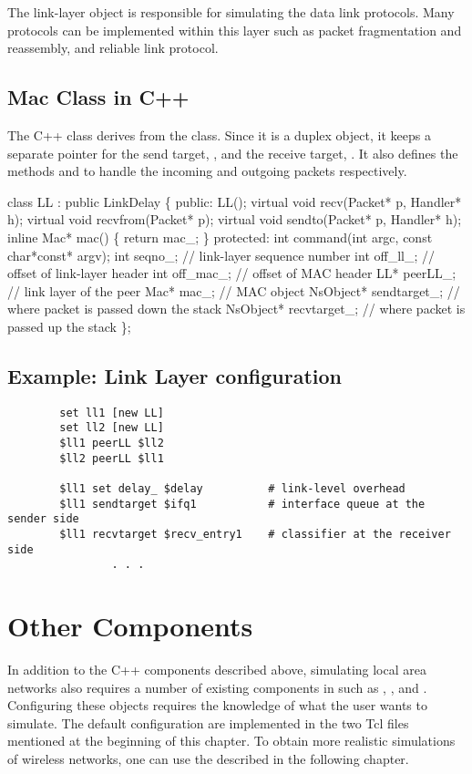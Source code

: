 The link-layer object is responsible for simulating the data link
protocols.  Many protocols can be implemented within this layer such as
packet fragmentation and reassembly, and reliable link protocol.

\subsection{Mac Class in C++}
\label{sec:maccplus}

The C++ class  derives from the  class.  Since
it is a duplex object, it keeps a separate pointer for the send target,
, and the receive target, .  It also
defines the methods  and  to handle the
incoming and outgoing packets respectively.

\begin{program}
   class LL : public LinkDelay \{
   public:
        LL();
        virtual void recv(Packet* p, Handler* h);
        virtual void recvfrom(Packet* p);
        virtual void sendto(Packet* p, Handler* h);
        inline Mac* mac() \{ return mac_; \}
   protected:
        int command(int argc, const char*const* argv);
        int seqno_;		// link-layer sequence number
        int off_ll_;		// offset of link-layer header
        int off_mac_;		// offset of MAC header
        LL* peerLL_;		// link layer of the peer
        Mac* mac_;		// MAC object
        NsObject* sendtarget_;	// where packet is passed down the stack
        NsObject* recvtarget_;	// where packet is passed up the stack
   \};
\end{program}

\subsection{Example: Link Layer configuration}
\label{ex:linklayer}

\begin{verbatim}
        set ll1 [new LL]
        set ll2 [new LL]
        $ll1 peerLL $ll2
        $ll2 peerLL $ll1

        $ll1 set delay_ $delay          # link-level overhead
        $ll1 sendtarget $ifq1           # interface queue at the sender side
        $ll1 recvtarget $recv_entry1    # classifier at the receiver side
                . . .
\end{verbatim}


\section{Other Components}
\label{sec:lan_others}

In addition to the C++ components described above, simulating local area
networks also requires a number of existing components in \ns such as
, , and .  Configuring these
objects requires the knowledge of what the user wants to simulate.  The
default configuration are implemented in the two Tcl files mentioned at
the beginning of this chapter.  To obtain more realistic simulations of
wireless networks, one can use the  described in the
following chapter.

%
